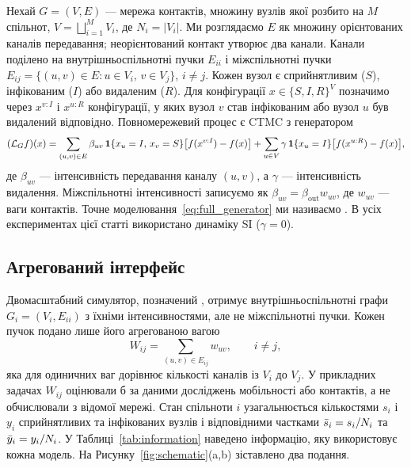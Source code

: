 Нехай $G=(V,E)$ --- мережа контактів, множину вузлів якої розбито на $M$ спільнот, $V=\bigsqcup_{i=1}^{M}V_i$, де $N_i=|V_i|$. Ми розглядаємо $E$ як множину орієнтованих каналів передавання; неорієнтований контакт утворює два канали. Канали поділено на внутрішньоспільнотні пучки $E_{ii}$ і міжспільнотні пучки $E_{ij}=\{(u,v)\in E:u\in V_i,\,v\in V_j\}$, $i\neq j$. Кожен вузол є сприйнятливим ($S$), інфікованим ($I$) або видаленим ($R$). Для конфігурації $x\in\{S,I,R\}^V$ позначимо через $x^{v:I}$ і $x^{u:R}$ конфігурації, у яких вузол $v$ став інфікованим або вузол $u$ був видалений відповідно. Повномережевий процес є CTMC з генератором
\begin{equation}
\label{eq:full_generator}
(\mathcal{L}_G f)(x)=\sum_{(u,v)\in E}\beta_{uv}\,\mathbf{1}\{x_u=I,\,x_v=S\}\bigl[f(x^{v:I})-f(x)\bigr]
+\sum_{u\in V}\gamma\,\mathbf{1}\{x_u=I\}\bigl[f(x^{u:R})-f(x)\bigr],
\end{equation}
де $\beta_{uv}$ --- інтенсивність передавання каналу $(u,v)$, а $\gamma$ --- інтенсивність видалення. Міжспільнотні інтенсивності записуємо як $\beta_{uv}=\beta_{\mathrm{out}}w_{uv}$, де $w_{uv}$ --- ваги контактів. Точне моделювання~\eqref{eq:full_generator} ми називаємо \Full{}. В усіх експериментах цієї статті використано динаміку SI ($\gamma=0$).

\subsection{Агрегований інтерфейс}
\label{sec:interface}

Двомасштабний симулятор, позначений \TS{}, отримує внутрішньоспільнотні графи $G_i=(V_i,E_{ii})$ з їхніми інтенсивностями, але не міжспільнотні пучки. Кожен пучок подано лише його агрегованою вагою
\begin{equation}
\label{eq:weight}
W_{ij}=\sum_{(u,v)\in E_{ij}}w_{uv},\qquad i\neq j,
\end{equation}
яка для одиничних ваг дорівнює кількості каналів із $V_i$ до $V_j$. У прикладних задачах $W_{ij}$ оцінювали б за даними досліджень мобільності або контактів, а не обчислювали з відомої мережі. Стан спільноти $i$ узагальнюється кількостями $s_i$ і $y_i$ сприйнятливих та інфікованих вузлів і відповідними частками $\bar{s}_i=s_i/N_i$ та $\bar{y}_i=y_i/N_i$. У Таблиці~\ref{tab:information} наведено інформацію, яку використовує кожна модель. На Рисунку~\ref{fig:schematic}(a,b) зіставлено два подання.

